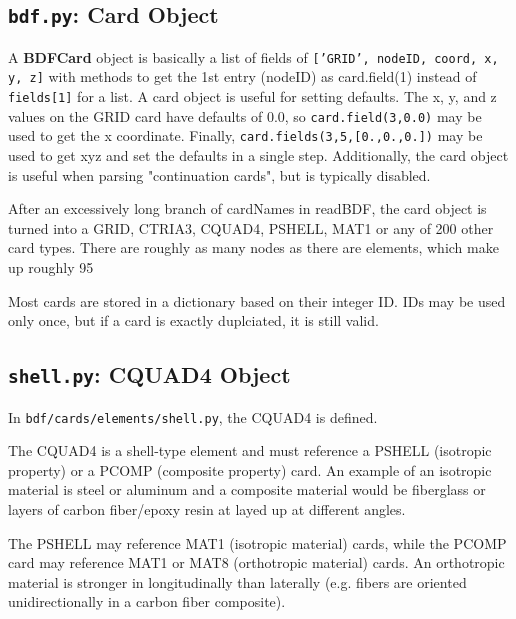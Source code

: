      
 \subsection{{\tt bdf.py}: Card Object}
     A {\bf BDFCard} object is basically a list of fields of {\tt ['GRID', nodeID, coord, x, y, z]}  with methods to get the 1st entry (nodeID) as card.field(1) instead of {\tt fields[1]} for a list.  A card object is useful for setting defaults.  The x, y, and z values on the GRID card have defaults of 0.0, so {\tt card.field(3,0.0)} may be used to get the x coordinate. Finally, {\tt card.fields(3,5,[0.,0.,0.])} may be used to get xyz and set the defaults in a single step.  Additionally, the card object is useful when parsing "continuation cards", but is typically disabled.  
     
     After an excessively long branch of cardNames in readBDF, the card object is turned into a GRID, CTRIA3, CQUAD4, PSHELL, MAT1 or any of 200 other card types.  There are roughly as many nodes as there are elements, which make up roughly 95%
   
     Most cards are stored in a dictionary based on their integer ID.  IDs may be used only once, but if a card is exactly duplciated, it is still valid.

 \subsection{{\tt shell.py}: CQUAD4 Object}
     In {\tt bdf/cards/elements/shell.py}, the CQUAD4 is defined.
     
     The CQUAD4 is a shell-type element and must reference a PSHELL (isotropic property) or a PCOMP (composite property) card.  An example of an isotropic material is steel or aluminum and a composite material would be fiberglass or layers of carbon fiber/epoxy resin at layed up at different angles.
     
     The PSHELL may reference MAT1 (isotropic material) cards, while the PCOMP card may reference MAT1 or MAT8 (orthotropic material) cards.  An orthotropic material is stronger in longitudinally than laterally (e.g. fibers are oriented unidirectionally in a carbon fiber composite).
     
